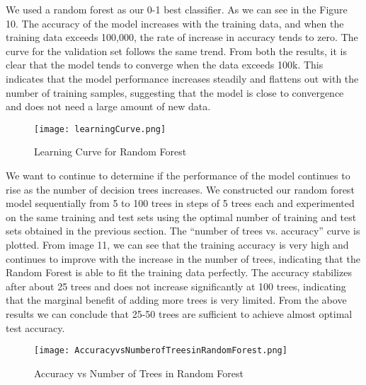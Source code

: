 \documentclass[10pt,letterpaper]{article}
\begin{document}
We used a random forest as our 0-1 best classifier. As we can see in the Figure 10. The accuracy of the model increases with the training data, and when the training data exceeds 100,000, the rate of increase in accuracy tends to zero. The curve for the validation set follows the same trend. From both the results, it is clear that the model tends to converge when the data exceeds 100k. This indicates that the model performance increases steadily and flattens out with the number of training samples, suggesting that the model is close to convergence and does not need a large amount of new data.
\begin{figure}[H]
    \centering
    \texttt{[image: learningCurve.png]}
    \caption{Learning Curve for Random Forest}
    \label{fig:}
\end{figure}
We want to continue to determine if the performance of the model continues to rise as the number of decision trees increases. We constructed our random forest model sequentially from 5 to 100 trees in steps of 5 trees each and experimented on the same training and test sets using the optimal number of training and test sets obtained in the previous section. The “number of trees vs. accuracy” curve is plotted. From image 11, we can see that the training accuracy is very high and continues to improve with the increase in the number of trees, indicating that the Random Forest is able to fit the training data perfectly. The accuracy stabilizes after about 25 trees and does not increase significantly at 100 trees, indicating that the marginal benefit of adding more trees is very limited. From the above results we can conclude that 25-50 trees are sufficient to achieve almost optimal test accuracy.
\begin{figure}[H]
    \centering
    \texttt{[image: AccuracyvsNumberofTreesinRandomForest.png]}
    \caption{Accuracy vs Number of Trees in Random Forest}
    \label{fig:}
\end{figure}
\end{document}
